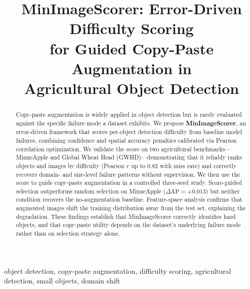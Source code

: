 \documentclass[conference]{IEEEtran}
\begin{document}
\title{MinImageScorer: Error-Driven Difficulty Scoring\\
for Guided Copy-Paste Augmentation in\\
Agricultural Object Detection}

\author{
}

\maketitle

\begin{abstract}
Copy-paste augmentation is widely applied in object detection
but is rarely evaluated against the specific failure mode a
dataset exhibits. We propose \textbf{MinImageScorer}, an
error-driven framework that scores per-object detection difficulty
from baseline model failures, combining confidence and spatial
accuracy penalties calibrated via Pearson correlation optimization.
We validate the score on two agricultural benchmarks---MinneApple
and Global Wheat Head (GWHD)---demonstrating that it reliably
ranks objects and images by difficulty (Pearson $r$ up to $0.82$
with miss rate) and correctly recovers domain- and size-level
failure patterns without supervision. We then use the score to
guide copy-paste augmentation in a controlled three-seed study.
Score-guided selection outperforms random selection on MinneApple
($\Delta\mathrm{AP}{=}{+}0.013$) but neither condition recovers
the no-augmentation baseline. Feature-space analysis confirms
that augmented images shift the training distribution away from
the test set, explaining the degradation. These findings establish
that MinImageScorer correctly identifies hard objects, and that
copy-paste utility depends on the dataset's underlying failure mode
rather than on selection strategy alone.
\end{abstract}

\begin{IEEEkeywords}
object detection, copy-paste augmentation, difficulty scoring,
agricultural detection, small objects, domain shift
\end{IEEEkeywords}

\end{document}
